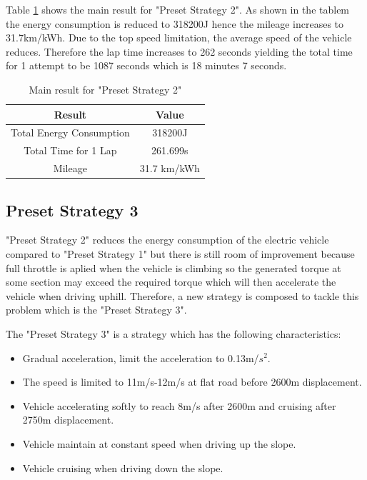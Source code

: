 Table \ref{tb:preset2Result} shows the main result for "Preset Strategy 2". As shown in the tablem the energy consumption is reduced to 318200J hence the mileage increases to 31.7km/kWh. Due to the top speed limitation, the average speed of the vehicle reduces. Therefore the lap time increases to 262 seconds yielding the total time for 1 attempt to be 1087 seconds which is 18 minutes 7 seconds. 

\begin{table}[htbp]
\begin{center}
\begin{tabular}{|c|c|}
\hline
\textbf{Result} & \textbf{Value} \\ \hline
Total Energy Consumption & 318200J \\ \hline
Total Time for 1 Lap & 261.699s \\ \hline
Mileage & 31.7 km/kWh \\ \hline
\end{tabular}
\end{center}
\caption{Main result for "Preset Strategy 2" }
\label{tb:preset2Result}
\end{table} \clearpage

\subsection{Preset Strategy 3}

"Preset Strategy 2" reduces the energy consumption of the electric vehicle compared to "Preset Strategy 1" but there is still room of improvement because full throttle is aplied when the vehicle is climbing so the generated torque at some section may exceed the required torque which will then accelerate the vehicle when driving uphill. Therefore, a new strategy is composed to tackle this problem which is the "Preset Strategy 3".

The "Preset Strategy 3" is a strategy which has the following characteristics:

\begin{itemize}
	\item{Gradual acceleration, limit the acceleration to 0.13m/$s^2$.}
	\item{The speed is limited to 11m/s-12m/s at flat road before 2600m displacement.}
	\item{Vehicle accelerating softly to reach 8m/s after 2600m and cruising after 2750m displacement.}
	\item{Vehicle maintain at constant speed when driving up the slope.}
	\item{Vehicle cruising when driving down the slope.}
\end{itemize}

